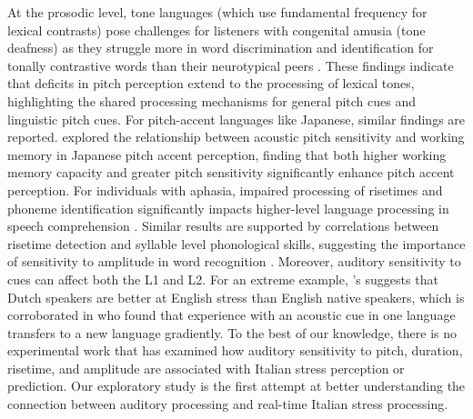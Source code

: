 At the prosodic level, tone languages (which use fundamental frequency for lexical contrasts) pose challenges for listeners with congenital amusia (tone deafness) as they struggle more in word discrimination and identification for tonally contrastive words than their neurotypical peers \citep{nan_2010, zhu2023tone}. These findings indicate that deficits in pitch perception extend to the processing of lexical tones, highlighting the shared processing mechanisms for general pitch cues and linguistic pitch cues. For pitch-accent languages like Japanese, similar findings are reported. \cite{goss_2014} explored the relationship between acoustic pitch sensitivity and working memory in Japanese pitch accent perception, finding that both higher working memory capacity and greater pitch sensitivity significantly enhance pitch accent perception. For individuals with aphasia, impaired processing of risetimes and phoneme identification significantly impacts higher-level language processing in speech comprehension \citep{Kries2023}. Similar results are supported by correlations between risetime detection and syllable level phonological skills, suggesting the importance of sensitivity to amplitude in word recognition \citep{Hamalaine2005}. Moreover, auditory sensitivity to cues can affect both the L1 and L2. For an extreme example, \cite{cutler2007dutch}'s suggests that Dutch speakers are better at English stress than English native speakers, which is corroborated in \cite{Pajak2014} who found that experience with an acoustic cue in one language transfers to a new language gradiently. To the best of our knowledge, there is no experimental work that has examined how auditory sensitivity to pitch, duration, risetime, and amplitude are associated with Italian stress perception or prediction. Our exploratory study is the first attempt at better understanding the connection between auditory processing and real-time Italian stress processing. 


